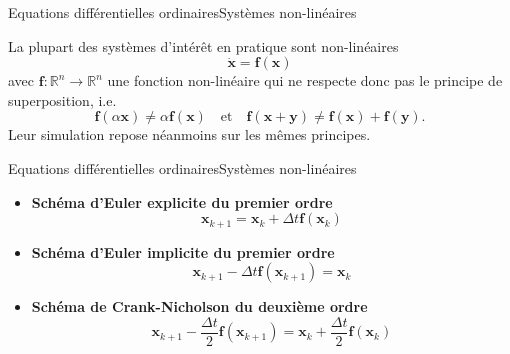 \documentclass[usenames,dvipsnames,svgnames,10pt,aspectratio=169]{beamer}
\begin{document}
\begin{frame}[t, c]{Equations différentielles ordinaires}{Systèmes non-linéaires}
  \begin{minipage}{.68\textwidth}
    La plupart des systèmes d'intérêt en pratique sont non-linéaires
    \[
    \dot{\bm{x}} = \bm{f}(\bm{x})
    \]
    avec $\bm{f} : \mathbb{R}^n \to \mathbb{R}^n$ une fonction non-linéaire qui ne respecte donc pas le principe de superposition, i.e.
    \[
    \bm{f}(\alpha \bm{x}) \neq \alpha \bm{f}(\bm{x}) \quad \text{et} \quad \bm{f}(\bm{x} + \bm{y}) \neq \bm{f}(\bm{x}) + \bm{f}(\bm{y}).
    \]
    Leur simulation repose néanmoins sur les mêmes principes.
  \end{minipage}%
  \hfill
  \begin{minipage}{.28\textwidth}
  \end{minipage}
\end{frame}

\begin{frame}[t, c]{Equations différentielles ordinaires}{Systèmes non-linéaires}
  \begin{minipage}{.68\textwidth}
    \begin{itemize}
    \item \alert{\textbf{Schéma d'Euler explicite du premier ordre}}
      \[
      \bm{x}_{k+1} = \bm{x}_k + \Delta t \bm{f}(\bm{x}_k)
      \]

    \item \alert{\textbf{Schéma d'Euler implicite du premier ordre}}
      \[
      \bm{x}_{k+1} - \Delta t \bm{f}(\bm{x}_{k+1}) = \bm{x}_k
      \]

    \item \alert{\textbf{Schéma de Crank-Nicholson du deuxième ordre}}
      \[
      \bm{x}_{k+1} - \dfrac{\Delta t}{2} \bm{f}(\bm{x}_{k+1}) = \bm{x}_k + \dfrac{\Delta t}{2} \bm{f}(\bm{x}_k)
      \]
    \end{itemize}
  \end{minipage}%
  \hfill
  \begin{minipage}{.28\textwidth}
  \end{minipage}
\end{frame}
\end{document}
